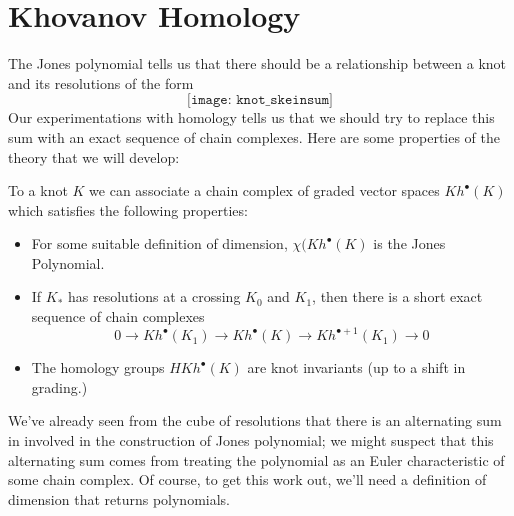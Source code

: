 \section{Khovanov Homology}
The Jones polynomial tells us that there should be a relationship between a knot and its resolutions of the form
\[\texttt{[image: knot\_skeinsum]}\]
Our experimentations with homology tells us that we should try to replace this sum with an exact sequence of chain complexes. Here are some properties of the theory that we will develop:
\begin{theorem}
To a knot $K$ we can associate a chain complex of graded vector spaces $Kh^\bullet(K)$ which satisfies the following properties:
\begin{itemize}
\item For some suitable definition of dimension, $\chi(Kh^\bullet(K)$ is the Jones Polynomial. 
\item If $K_*$ has resolutions at a crossing $K_0$ and $K_1$, then there is a short exact sequence of chain complexes
\[0\to Kh^\bullet(K_1)\to Kh^\bullet(K)\to Kh^{\bullet+1}(K_1)\to 0\]
\item The homology groups $HKh^\bullet(K)$ are knot invariants (up to a shift in grading.)
\end{itemize}
\end{theorem} 
We've already seen from the cube of resolutions that there is an alternating sum in involved in the construction of Jones polynomial; we might suspect that this alternating sum comes from treating the polynomial as an Euler characteristic of some chain complex. Of course, to get this work out, we'll need a definition of dimension that returns polynomials. 

